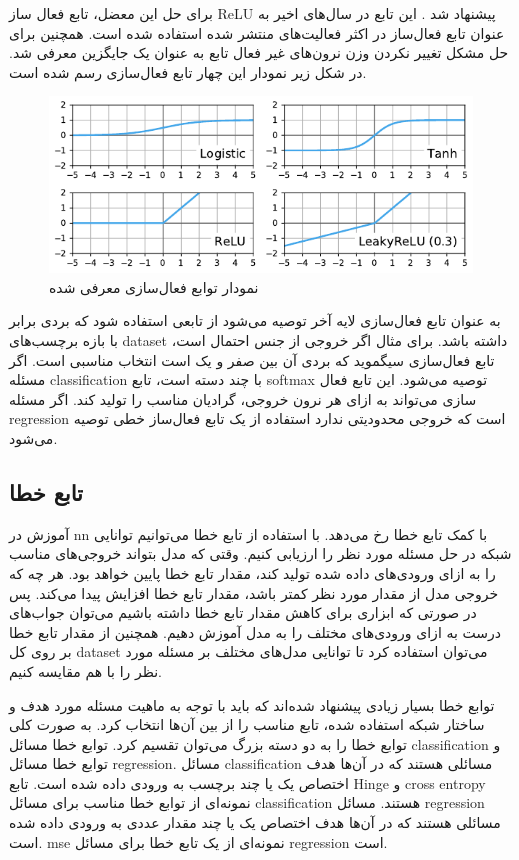 برای حل این معضل، تابع فعال ساز ReLU پیشنهاد شد \cite{glorot2011deep}. این تابع
در سال‌های اخیر به عنوان تابع فعال‌ساز در اکثر فعالیت‌های منتشر شده استفاده شده
است. همچنین برای حل مشکل تغییر نکردن وزن نرون‌های غیر فعال تابع 
به عنوان یک جایگزین معرفی شد. در شکل زیر نمودار این چهار تابع فعال‌سازی رسم شده
است.
\begin{figure}[ht]
    \centering
    \includegraphics[width=12cm]{./statics/activation_functions.png}
    \caption{نمودار توابع فعال‌سازی معرفی شده}
\end{figure}

به عنوان تابع فعال‌سازی لایه آخر توصیه می‌شود از تابعی استفاده شود که بردی برابر
با بازه برچسب‌های \gls{dataset} داشته باشد. برای مثال اگر خروجی از جنس احتمال
است، تابع فعال‌سازی سیگموید که بردی آن بین صفر و یک است انتخاب مناسبی است. اگر
مسئله \gls{classification} با چند دسته است، تابع softmax توصیه می‌شود. این تابع
فعال سازی می‌تواند به ازای هر نرون خروجی، گرادیان مناسب را تولید کند. اگر مسئله
\gls{regression} است که خروجی محدودیتی ندارد استفاده از یک تابع فعال‌ساز خطی
توصیه می‌شود.

\subsection{تابع خطا}
آموزش در \gls{nn} با کمک تابع خطا رخ می‌دهد. با استفاده از تابع خطا می‌توانیم
توانایی شبکه در حل مسئله مورد نظر را ارزیابی کنیم. وقتی که مدل بتواند خروجی‌های
مناسب را به ازای ورودی‌های داده شده تولید کند، مقدار تابع خطا پایین خواهد بود.
هر چه که خروجی مدل از مقدار مورد نظر کمتر باشد، مقدار تابع خطا افزایش پیدا
می‌کند. پس در صورتی که ابزاری برای کاهش مقدار تابع خطا داشته باشیم می‌توان
جواب‌های درست به ازای ورودی‌های مختلف را به مدل آموزش دهیم. همچنین از مقدار تابع
خطا بر روی کل \gls{dataset} می‌توان استفاده کرد تا توانایی مدل‌های مختلف بر
مسئله مورد نظر را با هم مقایسه کنیم.

توابع خطا بسیار زیادی پیشنهاد شده‌اند که باید با توجه به ماهیت مسئله مورد هدف و
ساختار شبکه استفاده شده، تابع مناسب را از بین آن‌ها انتخاب کرد. به صورت کلی
توابع خطا را به دو دسته بزرگ می‌توان تقسیم کرد. توابع خطا مسائل
\gls{classification} و توابع خطا مسائل \gls{regression}. مسائل
\gls{classification} مسائلی هستند که در آن‌ها هدف اختصاص یک یا چند برچسب به
ورودی داده شده است. تابع Hinge و \gls{cross entropy} نمونه‌ای از توابع خطا مناسب
برای مسائل \gls{classification} هستند. مسائل \gls{regression} مسائلی هستند که در
آن‌ها هدف اختصاص یک یا چند مقدار عددی به ورودی داده شده است. \gls{mse} نمونه‌ای
از یک تابع خطا برای مسائل \gls{regression} است.

